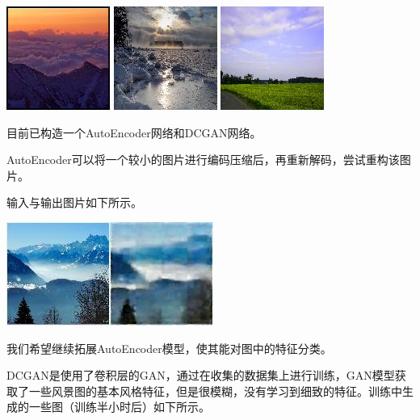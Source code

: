 \documentclass{article}
\begin{document}
\begin{CJK*}{UTF8}{gbsn}
\includegraphics{./data7.jpg}
\includegraphics{./data8.jpg}
\includegraphics{./data9.jpg}


目前已构造一个AutoEncoder网络和DCGAN网络。

AutoEncoder可以将一个较小的图片进行编码压缩后，再重新解码，尝试重构该图片。

输入与输出图片如下所示。

\includegraphics{./target.jpg}\includegraphics{./gen.jpg}

我们希望继续拓展AutoEncoder模型，使其能对图中的特征分类。

DCGAN是使用了卷积层的GAN，通过在收集的数据集上进行训练，GAN模型获取了一些风景图的基本风格特征，但是很模糊，没有学习到细致的特征。训练中生成的一些图（训练半小时后）如下所示。


\end{CJK*}
\end{document}
